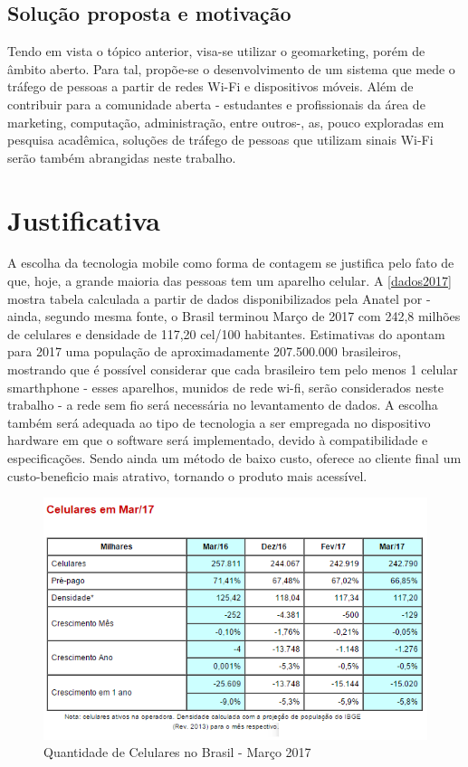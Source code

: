 \subsection{Solução proposta e motivação}
Tendo em vista o tópico anterior, visa-se utilizar o geomarketing, porém de
âmbito aberto. Para tal, propõe-se o desenvolvimento de um sistema que mede o
tráfego de pessoas a partir de redes Wi-Fi e dispositivos móveis. Além de
contribuir para a comunidade aberta - estudantes e profissionais da área de
marketing, computação, administração, entre outros-, as, pouco exploradas em
pesquisa acadêmica, soluções de tráfego de pessoas que utilizam sinais Wi-Fi
serão também abrangidas neste trabalho.

\section{Justificativa}
\label{justificativa}

A escolha da tecnologia mobile como forma de contagem se justifica pelo fato de que, hoje, a grande maioria das pessoas tem um aparelho celular. A \autoref{dados2017} mostra tabela calculada a partir de dados disponibilizados pela Anatel por  - ainda, segundo mesma fonte, o Brasil terminou Março de 2017 com 242,8 milhões de celulares e densidade de 117,20 cel/100 habitantes. Estimativas do  apontam para 2017 uma população de aproximadamente 207.500.000 brasileiros, mostrando que é possível considerar que cada brasileiro tem pelo menos 1 celular smarthphone - esses aparelhos, munidos de rede wi-fi, serão considerados neste trabalho - a rede sem fio será necessária no levantamento de dados. A escolha também será adequada ao tipo de tecnologia a ser empregada no dispositivo hardware em que o software será implementado, devido à compatibilidade e especificações. Sendo ainda um método de baixo custo, oferece ao cliente final um custo-beneficio mais atrativo, tornando o produto mais acessível.

\begin{figure}[htb]
  \caption{\label{dados2017}Quantidade de Celulares no Brasil - Março 2017}
  \begin{center}
    \includegraphics[width=1.0\textwidth]{img/dados2017.png}
  \end{center}
\end{figure}


